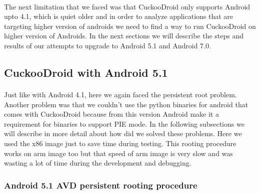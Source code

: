 \documentclass[../main.tex]{subfile}
\begin{document}
		\paragraph{} The next limitation that we faced was that CuckooDroid only supports Android upto 4.1, which is quiet older and in order to analyze applications that are targeting higher version of androids we need to find a way to run CuckooDroid on higher version of Androids. In the next sections we will describe the steps and results of our attempts to upgrade to Android 5.1 and Android 7.0.

		\subsection{CuckooDroid with Android 5.1}
		\paragraph{} Just like with Android 4.1, here we again faced the persistent root problem. Another problem was that we couldn't use the python binaries for android that comes with CuckooDroid because from this version Android make it a requirement for binaries to support PIE mode. In the following subsections we will describe in more detail about how did we solved these problems. Here we used the x86 image just to save time during testing. This rooting procedure works on arm image too but that speed of arm image is very slow and was wasting a lot of time during the development and debugging.
		
		\subsubsection{Android 5.1 AVD persistent rooting procedure} \label{sec:android_5.1_root}
\end{document}

